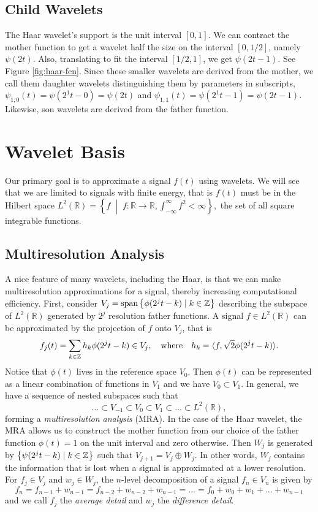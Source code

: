 \documentclass{article}
\DeclarePairedDelimiter{\iprod}{\langle}{\rangle}
\def\RR{\mathbb{R}}
\def\ZZ{\mathbb{Z}}
\DeclareMathOperator{\spans}{span}
\theoremstyle{definition}
\begin{document}
  \subsection{Child Wavelets}

  The Haar wavelet's support is the unit interval \([0,1]\). We can contract the mother function to get a wavelet half the size on the interval \([0,1/2]\), namely \(\psi(2t)\). Also, translating to fit the interval \([1/2,1]\), we get \(\psi(2t-1)\). See Figure \ref{fig:haar-fcn}. Since these smaller wavelets are derived from the mother, we call them daughter wavelets distinguishing them by parameters in subscripts, \(\psi_{1,0}(t) = \psi(2^1t-0) = \psi(2t)\) and \(\psi_{1,1}(t) = \psi(2^1t - 1) = \psi(2t-1)\). Likewise, son wavelets are derived from the father function.
  
  \section{Wavelet Basis}

  Our primary goal is to approximate a signal \(f(t)\) using wavelets. We will see that we are limited to signals with finite energy, that is \(f(t)\) must be in the Hilbert space
  \(L^2(\RR) = \left\{f \; \middle| \; f : \RR \to \RR, \int_{-\infty}^\infty f^2 < \infty\right\},\)
  the set of all square integrable functions.

  \subsection{Multiresolution Analysis}

  A nice feature of many wavelets, including the Haar, is that we can make multiresolution approximations for a signal, thereby increasing computational efficiency. First, consider \(V_j = \spans\qty{\phi(2^jt-k) \mid k \in \ZZ}\) describing the subspace of \(L^2(\mathbb{R})\) generated by \(2^j\) resolution father functions. A signal \(f \in L^2(\RR)\) can be approximated by the projection of \(f\) onto \(V_j\), that is
  \[
  f_j(t) = \sum_{k \in \ZZ} h_k \phi(2^jt-k) \in V_j, 
  \qq{where}
  h_k = \iprod{f,\sqrt{2}\phi(2^jt-k)}.
  \] Notice that \(\phi(t)\) lives in the reference space \(V_0\). Then \(\phi(t)\) can be represented as a linear combination of functions in \(V_1\) and we have \(V_0 \subset V_1\). In general, we have a sequence of nested subspaces such that
  \[\dots \subset V_{-1} \subset V_0 \subset V_1 \subset \dots \subset L^2(\mathbb{R}),\]
  forming a \textit{multiresolution analysis} (MRA). In the case of the Haar wavelet, the MRA allows us to construct the mother function from our choice of the father function \(\phi(t) = 1\) on the unit interval and zero otherwise. Then \(W_j\) is generated by \(\qty{\psi(2^jt-k) \mid k \in \ZZ}\) such that \(V_{j+1} = V_j \oplus W_j\). In other words, \(W_j\) contains the information that is lost when a signal is approximated at a lower resolution. For \(f_j \in V_j\) and \(w_j \in W_j\), the \(n\)-level decomposition of a signal \(f_n \in V_n\) is given by
  \[f_n = f_{n-1} + w_{n-1} = f_{n-2} + w_{n-2} + w_{n-1} = \dots = f_0 + w_0 + w_1 + \dots + w_{n-1}\]
  and we call \(f_j\) the \textit{average detail} and \(w_j\) the \textit{difference detail}.
\end{document}
